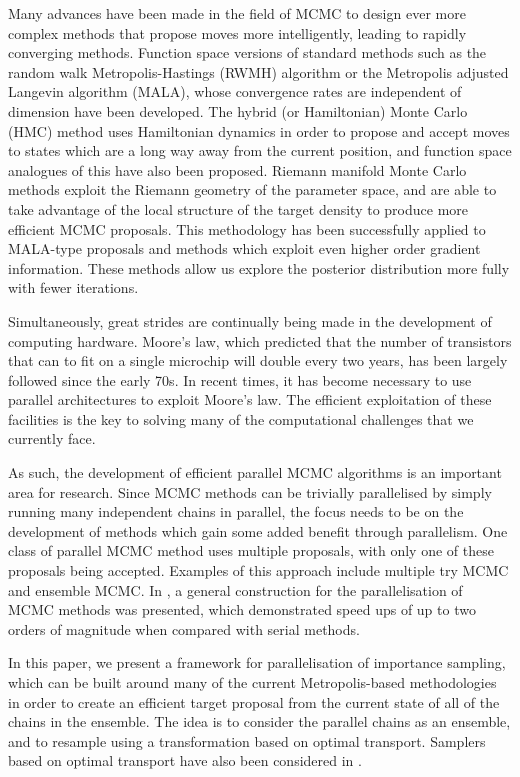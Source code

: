 \documentclass[final]{siamltex}
\begin{document}
Many advances have been made in the field of MCMC to design ever more
complex methods that propose moves more intelligently, leading to
rapidly converging methods. Function space versions of standard methods
such as the random walk Metropolis-Hastings (RWMH) algorithm or the
Metropolis adjusted Langevin algorithm (MALA), whose convergence rates
are independent of dimension have been
developed\cite{cotter2013mcmc}. The hybrid (or Hamiltonian) Monte
Carlo (HMC) method uses Hamiltonian dynamics in order to propose and
accept moves to states which are a long way away from the current
position\cite{sexton1992hamiltonian}, and function space analogues of
this have also been proposed\cite{beskos2011hybrid}. Riemann
manifold Monte Carlo methods exploit the Riemann geometry of the
parameter space, and are able to take advantage of the local structure
of the target density to produce more efficient MCMC
proposals\cite{girolami2011riemann}. This methodology has been
successfully applied to MALA-type proposals and methods which exploit
even higher order gradient information\cite{bui2014solving}.  These
methods allow us explore the posterior distribution more fully 
with fewer iterations.

Simultaneously, great strides are continually being made in the
development of computing hardware. Moore's law, which predicted that
the number of transistors that can to fit on a single microchip will
double every two years, has been largely followed since the early
70s\cite{moore1998cramming}. In recent times, it has become necessary
to use parallel architectures to exploit Moore's law. The efficient
exploitation of these facilities is the key to solving many of the
computational challenges that we currently face.

As such, the development of efficient parallel MCMC algorithms is an
important area for research. Since MCMC methods can be trivially
parallelised by simply running many independent chains in parallel,
the focus needs to be on the development of methods which gain some
added benefit through parallelism. One class of parallel MCMC method
uses multiple proposals, with only one of these proposals being
accepted. Examples of this approach include multiple try
MCMC\cite{liu2000multiple} and ensemble MCMC\cite{neal2011mcmc}. In
\cite{calderhead2014general}, a general construction for the
parallelisation of MCMC methods was presented, which demonstrated
speed ups of up to two orders of magnitude when compared with serial methods.

In this paper, we present a framework for parallelisation of
importance sampling, which can be built around many of the current
Metropolis-based methodologies in order to create an efficient target
proposal from the current state of all of the chains in the
ensemble. The idea is to consider the parallel chains as an ensemble,
and to resample using a transformation based on optimal transport.
Samplers based on optimal transport have also been considered in
\cite{el2012bayesian}.
\end{document}
